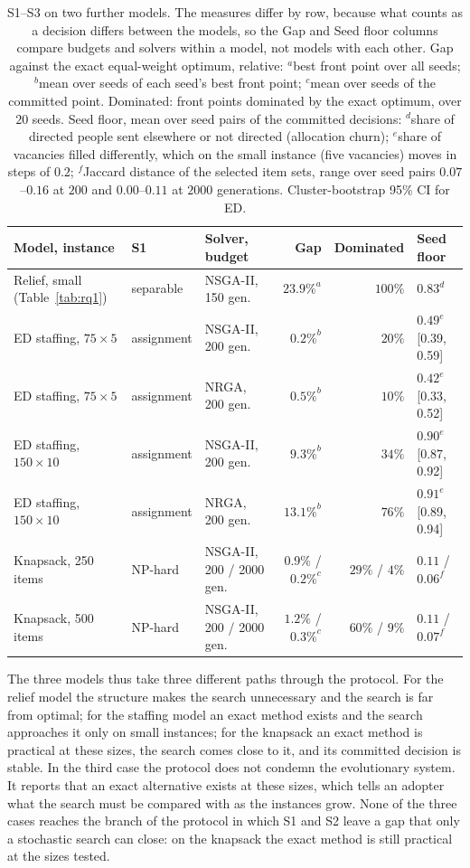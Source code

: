 \documentclass[systems,article,submit,moreauthors,pdftex]{Definitions/mdpi}
\begin{document}
\begin{table}[H]
\centering
\caption{S1--S3 on two further models. The measures differ by row, because what counts as a
decision differs between the models, so the Gap and Seed floor columns compare budgets and
solvers within a model, not models with each other. Gap against the exact equal-weight
optimum, relative: $^a$best front point over all seeds; $^b$mean over seeds of each seed's best
front point; $^c$mean over seeds of the committed point. Dominated: front points dominated by
the exact optimum, over $20$ seeds. Seed floor, mean over seed pairs of the committed decisions:
$^d$share of directed people sent elsewhere or not directed (allocation churn); $^e$share of
vacancies filled differently, which on the small instance (five vacancies) moves in steps of
$0.2$; $^f$Jaccard distance of the selected item sets, range over seed pairs $0.07$--$0.16$ at
$200$ and $0.00$--$0.11$ at $2000$ generations. Cluster-bootstrap 95\% CI for ED.\label{tab:cases}}
\footnotesize
\setlength{\tabcolsep}{4pt}
\begin{tabularx}{\textwidth}{l l >{\raggedright\arraybackslash}X r r l}
\toprule
Model, instance & S1 & Solver, budget & Gap & Dominated & Seed floor\\
\midrule
Relief, small (Table~\ref{tab:rq1}) & separable & NSGA-II, 150 gen. & $23.9\%^a$ & $100\%$ & $0.83^d$\\
ED staffing, $75\times5$ & assignment & NSGA-II, 200 gen. & $0.2\%^b$ & $20\%$ & $0.49^e$ [0.39, 0.59]\\
ED staffing, $75\times5$ & assignment & NRGA, 200 gen. & $0.5\%^b$ & $10\%$ & $0.42^e$ [0.33, 0.52]\\
ED staffing, $150\times10$ & assignment & NSGA-II, 200 gen. & $9.3\%^b$ & $34\%$ & $0.90^e$ [0.87, 0.92]\\
ED staffing, $150\times10$ & assignment & NRGA, 200 gen. & $13.1\%^b$ & $76\%$ & $0.91^e$ [0.89, 0.94]\\
Knapsack, 250 items & NP-hard & NSGA-II, 200 / 2000 gen. & $0.9\%$ / $0.2\%^c$ & $29\%$ / $4\%$ & $0.11$ / $0.06^f$\\
Knapsack, 500 items & NP-hard & NSGA-II, 200 / 2000 gen. & $1.2\%$ / $0.3\%^c$ & $60\%$ / $9\%$ & $0.11$ / $0.07^f$\\
\bottomrule
\end{tabularx}
\end{table}

The three models thus take three different paths through the protocol. For the relief model the
structure makes the search unnecessary and the search is far from optimal; for the staffing model
an exact method exists and the search approaches it only on small instances; for the knapsack an
exact method is practical at these sizes, the search comes close to it, and its committed
decision is stable. In the third case the protocol does not condemn the evolutionary system. It
reports that an exact alternative exists at these sizes, which tells an adopter what the search
must be compared with as the instances grow. None of the three cases reaches the branch of the
protocol in which S1 and S2 leave a gap that only a stochastic search can close: on the knapsack
the exact method is still practical at the sizes tested.
\end{document}
